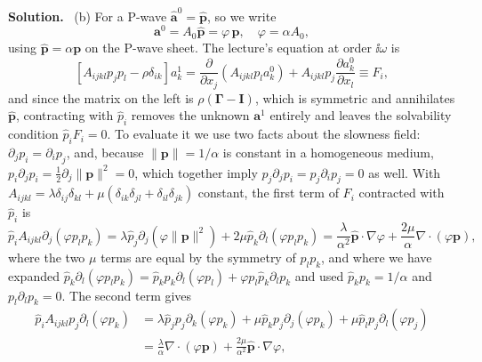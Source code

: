 \documentclass[a4paper,12pt]{paper}
\newenvironment{solution}{\par\noindent\textbf{Solution.}\ }{\par\medskip}
\begin{document}
\begin{solution}
\noindent (b) For a P-wave $\hat{\mathbf{a}}^{0}=\hat{\mathbf{p}}$, so we write
\begin{equation}
\mathbf{a}^{0}=A_{0}\hat{\mathbf{p}}=\varphi\,\mathbf{p},\quad \varphi=\alpha A_{0},
\label{eq:45}
\end{equation}
using $\hat{\mathbf{p}}=\alpha\mathbf{p}$ on the P-wave sheet. The lecture's equation at order
$\ii\omega$ is
\begin{equation}
\left[A_{ijkl}p_{j}p_{l}-\rho\delta_{ik}\right]a_{k}^{1}
=\frac{\partial}{\partial x_{j}}\left(A_{ijkl}p_{l}a_{k}^{0}\right)+A_{ijkl}p_{j}\frac{\partial a_{k}^{0}}{\partial x_{l}}\equiv F_{i},
\label{eq:46}
\end{equation}
and since the matrix on the left is $\rho(\bm{\Gamma}-\mathbf{I})$, which is symmetric and annihilates
$\hat{\mathbf{p}}$, contracting with $\hat{p}_{i}$ removes the unknown $\mathbf{a}^{1}$ entirely and
leaves the solvability condition $\hat{p}_{i}F_{i}=0$. To evaluate it we use two facts about the
slowness field: $\partial_{j}p_{i}=\partial_{i}p_{j}$, and, because $\|\mathbf{p}\|=1/\alpha$ is
constant in a homogeneous medium, $p_{i}\partial_{j}p_{i}=\frac{1}{2}\partial_{j}\|\mathbf{p}\|^{2}=0$,
which together imply $p_{j}\partial_{j}p_{i}=p_{j}\partial_{i}p_{j}=0$ as well. With
$A_{ijkl}=\lambda\delta_{ij}\delta_{kl}+\mu(\delta_{ik}\delta_{jl}+\delta_{il}\delta_{jk})$ constant, the
first term of $F_{i}$ contracted with $\hat{p}_{i}$ is
\begin{equation}
\hat{p}_{i}A_{ijkl}\partial_{j}(\varphi p_{l}p_{k})
=\lambda\hat{p}_{j}\partial_{j}\left(\varphi\|\mathbf{p}\|^{2}\right)+2\mu\hat{p}_{k}\partial_{l}(\varphi p_{l}p_{k})
=\frac{\lambda}{\alpha^{2}}\hat{\mathbf{p}}\cdot\nabla\varphi+\frac{2\mu}{\alpha}\nabla\cdot(\varphi\mathbf{p}),
\label{eq:47}
\end{equation}
where the two $\mu$ terms are equal by the symmetry of $p_{l}p_{k}$, and where we have expanded
$\hat{p}_{k}\partial_{l}(\varphi p_{l}p_{k})=\hat{p}_{k}p_{k}\partial_{l}(\varphi p_{l})+\varphi p_{l}\hat{p}_{k}\partial_{l}p_{k}$
and used $\hat{p}_{k}p_{k}=1/\alpha$ and $p_{l}\partial_{l}p_{k}=0$. The second term gives
\begin{equation}
\begin{split}
\hat{p}_{i}A_{ijkl}p_{j}\partial_{l}(\varphi p_{k})
&=\lambda\hat{p}_{j}p_{j}\partial_{k}(\varphi p_{k})+\mu\hat{p}_{k}p_{j}\partial_{j}(\varphi p_{k})+\mu\hat{p}_{l}p_{j}\partial_{l}(\varphi p_{j})\\
&=\frac{\lambda}{\alpha}\nabla\cdot(\varphi\mathbf{p})+\frac{2\mu}{\alpha^{2}}\hat{\mathbf{p}}\cdot\nabla\varphi,

\end{split}
\end{equation}
\end{solution}
\end{document}
